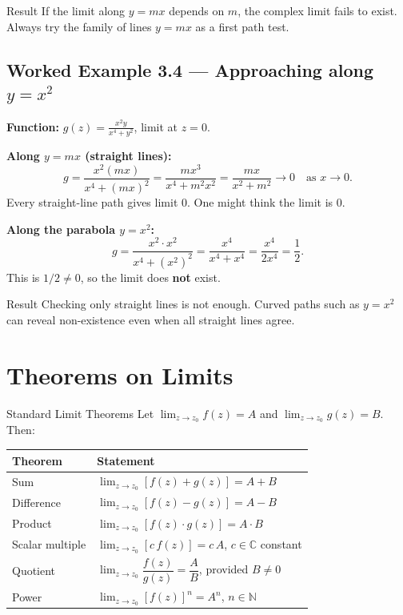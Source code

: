 \documentclass[12pt,a4paper]{article}
\begin{document}
\begin{learnbox}{Result}
If the limit along $y = mx$ depends on $m$, the complex limit fails to exist.
Always try the family of lines $y = mx$ as a first path test.
\end{learnbox}

\subsection*{Worked Example 3.4 --- Approaching along $y = x^2$}

\textbf{Function:} $\displaystyle g(z) = \frac{x^2 y}{x^4 + y^2}$, limit at $z = 0$.

\textbf{Along $y = mx$ (straight lines):}
\[
  g = \frac{x^2(mx)}{x^4+(mx)^2} = \frac{mx^3}{x^4+m^2x^2} = \frac{mx}{x^2+m^2} \to 0
  \quad\text{as } x \to 0.
\]
Every straight-line path gives limit $0$.  One might think the limit is $0$.

\textbf{Along the parabola $y = x^2$:}
\[
  g = \frac{x^2 \cdot x^2}{x^4 + (x^2)^2} = \frac{x^4}{x^4 + x^4} = \frac{x^4}{2x^4} = \frac{1}{2}.
\]
This is $1/2 \neq 0$, so the limit does \textbf{not} exist.

\begin{learnbox}{Result}
Checking only straight lines is not enough.  Curved paths such as $y = x^2$
can reveal non-existence even when all straight lines agree.
\end{learnbox}

\section{Theorems on Limits}

\begin{infobox}{Standard Limit Theorems}
Let $\lim_{z \to z_0} f(z) = A$ and $\lim_{z \to z_0} g(z) = B$.  Then:

\medskip
\begin{tabular}{ll}
\toprule
Theorem & Statement \\
\midrule
Sum & $\lim_{z \to z_0}[f(z) + g(z)] = A + B$ \\[4pt]
Difference & $\lim_{z \to z_0}[f(z) - g(z)] = A - B$ \\[4pt]
Product & $\lim_{z \to z_0}[f(z)\cdot g(z)] = A \cdot B$ \\[4pt]
Scalar multiple & $\lim_{z \to z_0}[c\,f(z)] = c\,A$, \quad $c \in \mathbb{C}$ constant \\[4pt]
Quotient & $\lim_{z \to z_0}\dfrac{f(z)}{g(z)} = \dfrac{A}{B}$, provided $B \neq 0$ \\[6pt]
Power & $\lim_{z \to z_0}[f(z)]^n = A^n$, \quad $n \in \mathbb{N}$ \\
\bottomrule
\end{tabular}
\end{infobox}
\end{document}
